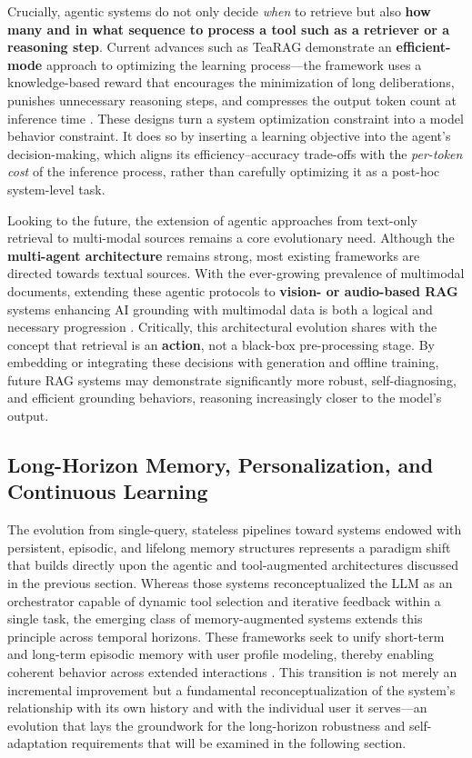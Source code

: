 \documentclass[11pt,a4paper]{article}
\begin{document}
Crucially, agentic systems do not only decide \emph{when} to retrieve but also \textbf{how many and in what sequence to process a tool such as a retriever or a reasoning step}. Current advances such as TeaRAG demonstrate an \textbf{efficient-mode} approach to optimizing the learning process---the framework uses a knowledge-based reward that encourages the minimization of long deliberations, punishes unnecessary reasoning steps, and compresses the output token count at inference time \cite{arxiv:2511.05385v2}. These designs turn a system optimization constraint into a model behavior constraint. It does so by inserting a learning objective into the agent's decision-making, which aligns its efficiency--accuracy trade-offs with the \emph{per-token cost} of the inference process, rather than carefully optimizing it as a post-hoc system-level task.

Looking to the future, the extension of agentic approaches from text-only retrieval to multi-modal sources remains a core evolutionary need. Although the \textbf{multi-agent architecture} remains strong, most existing frameworks are directed towards textual sources. With the ever-growing prevalence of multimodal documents, extending these agentic protocols to \textbf{vision- or audio-based RAG} systems enhancing AI grounding with multimodal data is both a logical and necessary progression \cite{arxiv:2410.10594v2,arxiv:2502.14727v1}. Critically, this architectural evolution shares with the concept that retrieval is an \textbf{action}, not a black-box pre-processing stage. By embedding or integrating these decisions with generation and offline training, future RAG systems may demonstrate significantly more robust, self-diagnosing, and efficient grounding behaviors, reasoning increasingly closer to the model's output.


\subsection{Long-Horizon Memory, Personalization, and Continuous Learning}


The evolution from single-query, stateless pipelines toward systems endowed with persistent, episodic, and lifelong memory structures represents a paradigm shift that builds directly upon the agentic and tool-augmented architectures discussed in the previous section. Whereas those systems reconceptualized the LLM as an orchestrator capable of dynamic tool selection and iterative feedback within a single task, the emerging class of memory-augmented systems extends this principle across temporal horizons. These frameworks seek to unify short-term and long-term episodic memory with user profile modeling, thereby enabling coherent behavior across extended interactions \cite{arxiv:2409.19401v1}. This transition is not merely an incremental improvement but a fundamental reconceptualization of the system's relationship with its own history and with the individual user it serves---an evolution that lays the groundwork for the long-horizon robustness and self-adaptation requirements that will be examined in the following section.
\end{document}
